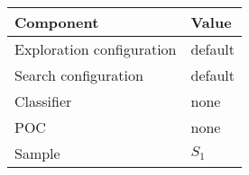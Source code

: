 \begin{tabular}{ll}
\hline
Component                    & Value         \\
\hline
Exploration configuration   & default       \\
Search configuration        & default       \\
Classifier                  & none          \\
POC                         & none          \\
Sample                      & $S_1$         \\
\hline
\end{tabular}